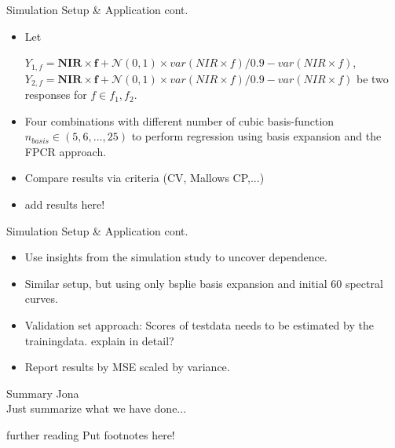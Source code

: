 \documentclass{beamer}
\begin{document}
	
	\begin{frame}{Simulation Setup \& Application cont.}
		\begin{itemize}
		\item
    		Let \\
    		 \vspace{0.1cm}
    		
    		$Y_{1,f} = \mathbf{NIR \times f}  + \mathcal{N}(0,1) \times var(NIR \times f)/0.9 - var(NIR \times f)$, \\
    		  $Y_{2,f} = \mathbf{NIR \times f} + \mathcal{N}(0,1) \times var(NIR \times f)/0.9 - var(NIR \times f)$ be two responses for $f \in f_1, f_2$.		
    		 	\item
    		 	 Four combinations with different number of cubic basis-function $n_{basis} \in (5,6,...,25)$ to perform regression using basis expansion and the FPCR approach.
			\item Compare results via criteria (CV, Mallows CP,...)
			\item 
			{\color{green} add results here!}
			
    		
		\end{itemize}
	\end{frame}
	
	
	\begin{frame}{Simulation Setup \& Application cont.}
		\begin{itemize}
		\item
    		Use insights from the simulation study to uncover dependence.
    		\item
    		Similar setup, but using only bsplie basis expansion and initial 60 spectral curves.
    		\item
    		Validation set approach:	Scores of testdata needs to be estimated by the trainingdata.  {\color{green} explain in detail?}
    		\item
    		Report results by MSE scaled by variance.
		\end{itemize}
	\end{frame}
	
	

	\begin{frame}{Summary}
		Jona \\
		Just summarize what we have done...
	\end{frame}

	\begin{frame}{further reading}
		Put footnotes here!
	\end{frame}
	
\end{document}
